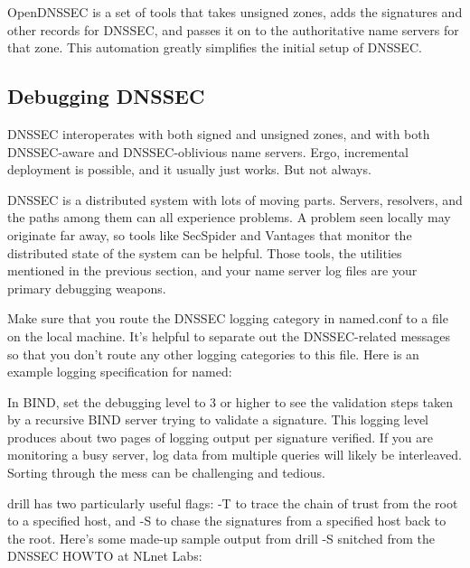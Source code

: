 OpenDNSSEC is a set of tools that takes unsigned zones, adds the
signatures and other records for DNSSEC, and passes it on to the
authoritative name servers for that zone. This automation greatly
simplifies the initial setup of DNSSEC.

\protect\hypertarget{part0024_split_068.html}{}{}

\hypertarget{part0024_split_068.htmlux5cux23_idContainer1069}{}
\hypertarget{part0024_split_068.htmlux5cux23calibre_pb_67}{%
\subsection[Debugging
DNSSEC]{\texorpdfstring{\protect\hypertarget{part0024_split_068.htmlux5cux23_idTextAnchor953}{}{}Debugging
DNSSEC}{Debugging DNSSEC}}\label{part0024_split_068.htmlux5cux23calibre_pb_67}}

DNSSEC interoperates with both signed and unsigned zones, and with both
DNSSEC-aware and DNSSEC-oblivious name servers. Ergo, incremental
deployment is possible, and it usually just works. But not always.

DNSSEC is a distributed system with lots of moving parts. Servers,
resolvers, and the paths among them can all experience problems. A
problem seen locally may originate far away, so tools like SecSpider and
Vantages that monitor the distributed state of the system can be
helpful. Those tools, the utilities mentioned in the previous section,
and your name server log files are your primary debugging weapons.

Make sure that you route the DNSSEC logging category in {named.conf }to
a file on the local machine. It's helpful to separate out the
DNSSEC-related messages so that you don't route any other logging
categories to this file. Here is an example logging specification for
{named}:


In BIND, set the debugging level to 3 or higher to see the validation
steps taken by a recursive BIND server trying to validate a signature.
This logging level produces about two pages of logging output per
signature verified. If you are monitoring a busy server, log data from
multiple queries will likely be interleaved. Sorting through the mess
can be challenging and tedious.

\protect\hypertarget{part0024_split_068.htmlux5cux23_idIndexMarker2277}{}{}\protect\hypertarget{part0024_split_068.htmlux5cux23_idIndexMarker2278}{}{}{drill}
has two particularly useful flags: {-T} to trace the chain of trust from
the root to a specified host, and {-S} to chase the signatures from a
specified host back to the root. Here's some made-up sample output from
{drill -S }snitched from the {DNSSEC HOWTO} at NLnet Labs:

